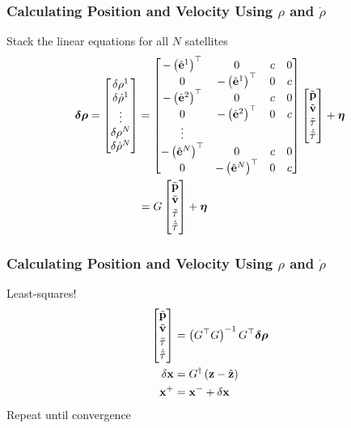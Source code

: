 \documentclass{beamer}
\begin{document}
\begin{frame}\frametitle{Calculating Position and Velocity Using $\rho$ and $\dot{\rho}$}
Stack the linear equations for all $N$ satellites
\begin{align*}
\boldsymbol{\delta\rho}=\begin{bmatrix}\delta\rho^{1}\\
\delta\dot{\rho}^{1}\\
\vdots\\
\delta\rho^{N}\\
\delta\dot{\rho}^{N}
\end{bmatrix} & =\begin{bmatrix}-\left(\hat{\mathbf{e}}^{1}\right)^{\top} & 0 & c & 0\\
0 & -\left(\hat{\mathbf{e}}^{1}\right)^{\top} & 0 & c\\
-\left(\hat{\mathbf{e}}^{2}\right)^{\top} & 0 & c & 0\\
0 & -\left(\hat{\mathbf{e}}^{2}\right)^{\top} & 0 & c\\
\vdots\\
-\left(\hat{\mathbf{e}}^{N}\right)^{\top} & 0 & c & 0\\
0 & -\left(\hat{\mathbf{e}}^{N}\right)^{\top}& 0 & c
\end{bmatrix}\begin{bmatrix}\tilde{\mathbf{p}}\\
\tilde{\mathbf{v}}\\
\tilde{\tau}\\
\dot{\tilde{\tau}}
\end{bmatrix}+\boldsymbol{\eta}\\
 & =G\begin{bmatrix}\tilde{\mathbf{p}}\\
\tilde{\mathbf{v}}\\
\tilde{\tau}\\
\dot{\tilde{\tau}}
\end{bmatrix}+\boldsymbol{\eta}
\end{align*}
\end{frame}


\begin{frame}\frametitle{Calculating Position and Velocity Using $\rho$ and $\dot{\rho}$}
Least-squares! 
\begin{align}
	\begin{bmatrix}\tilde{\mathbf{p}}\\
\tilde{\mathbf{v}}\\
\tilde{\tau}\\
\dot{\tilde{\tau}}
\end{bmatrix}&=\left(G^{\top}G\right)^{-1}G^{\top}\boldsymbol{\delta\rho}\\
\delta \mathbf{x} &= G^\dagger \left(\mathbf{z} - \hat{\mathbf{z}}\right) \\
{\mathbf{x}}^{+} &= {\mathbf{x}}^{-} + \delta{\mathbf{x}}
\end{align}
Repeat until convergence
\end{frame}
\end{document}

